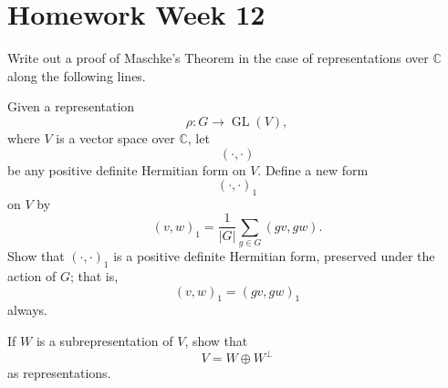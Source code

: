 \section{Homework Week 12}

\begin{exercise}
    Write out a proof of Maschke's Theorem in the case of representations over
    \(\mathbb{C}\) along the following lines.
    
    Given a representation
    \[
        \rho : G \longrightarrow \operatorname{GL}(V),
    \]
    where \(V\) is a vector space over \(\mathbb{C}\), let
    \[
        (\cdot,\cdot)
    \]
    be any positive definite Hermitian form on \(V\). Define a new form
    \[
        (\cdot,\cdot)_1
    \]
    on \(V\) by
    \[
        (v,w)_1
        =
        \frac{1}{|G|}
        \sum_{g\in G} (gv,gw).
    \]
    Show that \((\cdot,\cdot)_1\) is a positive definite Hermitian form, preserved
    under the action of \(G\); that is,
    \[
        (v,w)_1 = (gv,gw)_1
    \]
    always.
    
    If \(W\) is a subrepresentation of \(V\), show that
    \[
        V = W \oplus W^\perp
    \]
    as representations.
    \end{exercise}
    
